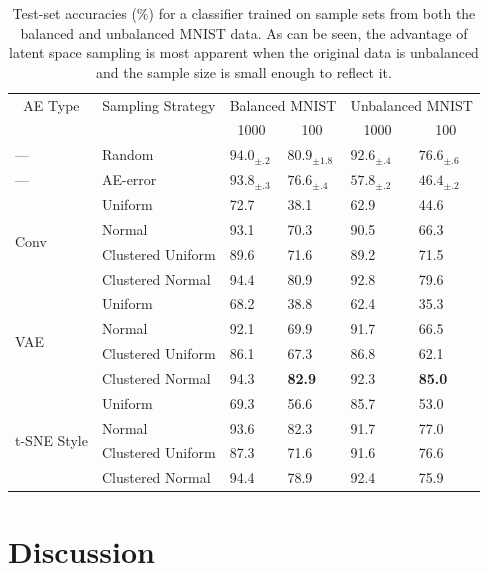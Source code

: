 \documentclass[a4paper]{article}
\begin{document}
\begin{table}[]
  \centering
  \begin{tabular}{|l|l|m{3em} m{3em}|m{3em} m{3em}|}
    \hline
    \multicolumn{1}{|c|}{AE Type} & \multicolumn{1}{|c|}{Sampling Strategy}
    & \multicolumn{2}{|c|}{Balanced MNIST} & \multicolumn{2}{|c|}{Unbalanced MNIST} \\
    & & \multicolumn{1}{|c}{1000} & \multicolumn{1}{c|}{100} & \multicolumn{1}{|c}{1000} & \multicolumn{1}{c|}{100} \\
    \hline
    --- & Random & $94.0_{\pm .2}$ & $80.9_{\pm 1.8}$ & $92.6_{\pm .4}$ & $76.6_{\pm .6}$\\
    \hline
    --- & AE-error & $93.8_{\pm .3}$ & $76.6_{\pm .4}$ & $57.8_{\pm .2}$ & $46.4_{\pm .2}$ \\
    \hline
    \multirow{4}{4em}{Conv}
    & Uniform
      & 72.7 & 38.1 & 62.9 & 44.6 \\
    & Normal
      & 93.1 & 70.3 & 90.5 & 66.3 \\
    & Clustered Uniform
      & 89.6 & 71.6 & 89.2 & 71.5 \\
    & Clustered Normal
      & 94.4 & 80.9 & 92.8 & 79.6 \\
    \hline
    \multirow{4}{4em}{VAE}
    & Uniform
      & 68.2 & 38.8 & 62.4 & 35.3 \\
    & Normal
      & 92.1 & 69.9 & 91.7 & 66.5 \\
    & Clustered Uniform
      & 86.1 & 67.3 & 86.8 & 62.1 \\
    & Clustered Normal
      & 94.3 & \textbf{82.9} & 92.3 & \textbf{85.0} \\
    \hline
    \multirow{4}{4em}{t-SNE Style}
    & Uniform
      & 69.3 & 56.6 & 85.7 & 53.0 \\
    & Normal
      & 93.6 & 82.3 & 91.7 & 77.0 \\
    & Clustered Uniform
      & 87.3 & 71.6 & 91.6 & 76.6 \\
    & Clustered Normal
      & 94.4 & 78.9 & 92.4 & 75.9 \\
    \hline
  \end{tabular}
  \caption{Test-set accuracies (\%) for a classifier trained on sample sets from
    both the balanced and unbalanced MNIST data. As can be seen, the advantage
    of latent space sampling is most apparent when the original data is
    unbalanced and the sample size is small enough to reflect it.}
  \label{tab:results}
\end{table}

\section{Discussion}
\label{sec:discussion}
\end{document}
